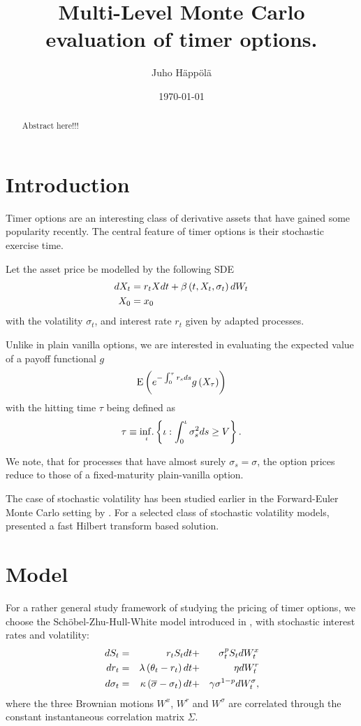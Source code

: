\documentclass[11pt]{amsart}
\title[MLMC for timer options]{Multi-Level Monte Carlo evaluation of timer options.}
\author{Juho H\"app\"ol\"a}
\date{\today}
\begin{document}
\begin{abstract}
Abstract here!!!
\end{abstract}

\maketitle


\section{Introduction}

Timer options are an interesting class of derivative assets that have gained some popularity recently. The central feature of timer options is their stochastic exercise time.

Let the asset price be modelled by the following SDE
\begin{align}
dX_t &= r_t X dt + \beta \left( {t,X_t, \sigma_t} \right) dW_t
\nonumber \\
X_0 &= x_0
\end{align}
with the volatility $\sigma_t$, and interest rate $r_t$
given by adapted processes.

Unlike in plain vanilla options, we are interested in evaluating
the expected value of a payoff functional $g$
\begin{align}
\mathrm{E} \left( {{e^{-\int_0^\tau r_s ds} g \left( {X_\tau} \right)}} \right)
\end{align}
with the hitting time $\tau$ being defined as
\begin{align}
\label{eq:hittingTimeDefinition}
\tau \equiv \mathop{\mathrm{inf.}}_{\iota}
\left\lbrace {\iota: \int_0^\iota \sigma_s^2 ds \geq V} \right\rbrace.
\end{align}

We note, that for processes that have almost surely $\sigma_s=\sigma$,
the option prices reduce to those of a fixed-maturity plain-vanilla option.

The case of stochastic volatility has been studied earlier
in the Forward-Euler Monte Carlo setting by \cite{bernard2011pricing}. For a selected class of stochastic
volatility models, \cite{zeng2015fast} presented a fast Hilbert transform based solution.

\section{Model}

For a rather general study framework of studying the pricing of timer options, we choose the Sch\"obel-Zhu-Hull-White model introduced in \cite{grzelak2012extension}, with stochastic interest rates and volatility:
\begin{align}
d S_t &=& r_t S_t dt &+& \sigma_t^p S_t dW_t^x 
\nonumber
\\
d r_t &=& \lambda \left( {\theta_t -r_t} \right) dt  &+& \eta dW_t^r
\\
d \sigma_t &=& \kappa \left( {\overline \sigma - \sigma_t} \right) dt
 &+& \gamma \sigma^{1-p} dW_t^\sigma
\nonumber,
\end{align}
where the three Brownian motions $W^x$, $W^r$ and $W^\sigma$
are correlated through the constant instantaneous correlation matrix
$\Sigma$.
\end{document}
